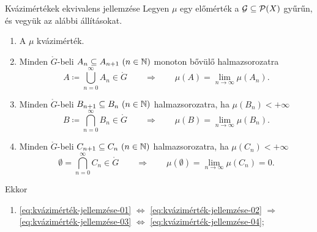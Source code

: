 \documentclass[
]{elteikthesis}[2024/04/26]
\begin{document}
	\begin{theorem}{Kvázimértékek ekvivalens jellemzése}{}
		Legyen \( \mu \) egy előmérték a \( \mathcal{G} \subseteq \mathcal{P}( X ) \) gyűrűn,
		és vegyük az alábbi állításokat.
		\begin{enumerate}[label=\alph*)]
			\item\label{eq:kvázimérték-jellemzése-01} A \( \mu \) kvázimérték.
			
			\item\label{eq:kvázimérték-jellemzése-02} 
			Minden \( \ring{G} \)-beli \( A_n \subseteq A_{n + 1} \ (n \in \mathbb{N}) \) 
			monoton bővülő halmazsorozatra
			\[
				A \coloneq \bigcup_{n=0}^{\infty} A_n \in \ring{G}
				\qquad \Longrightarrow \qquad
				\mu(A) = \lim_{n \to \infty} \mu(A_n).
			\]

			\item\label{eq:kvázimérték-jellemzése-03} 
			Minden \( \ring{G} \)-beli \( B_{n + 1} \subseteq B_n \ (n \in \mathbb{N}) \)
			halmazsorozatra, ha \( \mu(B_n) < +\infty \)
			\[
				B \coloneq \bigcap_{n=0}^{\infty} B_n \in \ring{G}
				\qquad \Longrightarrow \qquad
				\mu(B) = \lim_{n \to \infty} \mu(B_n).
			\]

			\item{}\label{eq:kvázimérték-jellemzése-04} 
			Minden \( \ring{G} \)-beli \( C_{n + 1} \subseteq C_n \ (n \in \mathbb{N}) \)
			halmazsorozatra, ha \( \mu(C_n) < +\infty \)
			\[
				\emptyset = \bigcap_{n=0}^{\infty} C_n \in \ring{G}
				\qquad \Longrightarrow \qquad
				\mu(\emptyset) = \lim_{n \to \infty} \mu(C_n) = 0.
			\]
		\end{enumerate}
		Ekkor
		\begin{enumerate}
			\item 
			\ref{eq:kvázimérték-jellemzése-01} \( \Longleftrightarrow \)
			\ref{eq:kvázimérték-jellemzése-02} \( \Longrightarrow \)
			\ref{eq:kvázimérték-jellemzése-03} \( \Longleftrightarrow \)
			\ref{eq:kvázimérték-jellemzése-04};
			

\end{enumerate}
\end{theorem}
\end{document}
